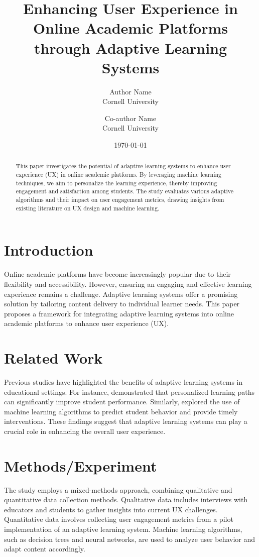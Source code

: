 \documentclass{article}
\title{Enhancing User Experience in Online Academic Platforms through Adaptive Learning Systems}
\author{Author Name \\
Cornell University \\
\and
Co-author Name \\
Cornell University}
\date{\today}
\begin{document}
\maketitle

\begin{abstract}
This paper investigates the potential of adaptive learning systems to enhance user experience (UX) in online academic platforms. By leveraging machine learning techniques, we aim to personalize the learning experience, thereby improving engagement and satisfaction among students. The study evaluates various adaptive algorithms and their impact on user engagement metrics, drawing insights from existing literature on UX design and machine learning.
\end{abstract}

\section{Introduction}
Online academic platforms have become increasingly popular due to their flexibility and accessibility. However, ensuring an engaging and effective learning experience remains a challenge. Adaptive learning systems offer a promising solution by tailoring content delivery to individual learner needs. This paper proposes a framework for integrating adaptive learning systems into online academic platforms to enhance user experience (UX).

\section{Related Work}
Previous studies have highlighted the benefits of adaptive learning systems in educational settings. For instance, \cite{AdaptiveLearningSystems} demonstrated that personalized learning paths can significantly improve student performance. Similarly, \cite{MachineLearningInEducation} explored the use of machine learning algorithms to predict student behavior and provide timely interventions. These findings suggest that adaptive learning systems can play a crucial role in enhancing the overall user experience.

\section{Methods/Experiment}
The study employs a mixed-methods approach, combining qualitative and quantitative data collection methods. Qualitative data includes interviews with educators and students to gather insights into current UX challenges. Quantitative data involves collecting user engagement metrics from a pilot implementation of an adaptive learning system. Machine learning algorithms, such as decision trees and neural networks, are used to analyze user behavior and adapt content accordingly.
\end{document}
